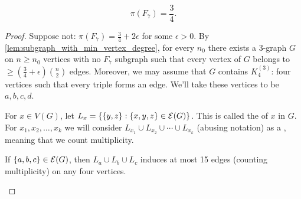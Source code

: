 \begin{theorem} 
\[	
\pi(F_7) = \frac{3}{4}.
\]
\end{theorem}
\begin{proof}	
Suppose not: $\pi(F_7) = \frac{3}{4}+ 2 \epsilon$ for some $\epsilon>0$. By \cref{lem:subgraph_with_min_vertex_degree},  for every $n_0$ there exists a $3$-graph $G$ on $n\geq n_0$ vertices with no $F_7$ subgraph such that every vertex of $G$ belongs to $\geq ( \frac{3}{4} + \epsilon) {n\choose 2}$ edges. Moreover, we may assume that $G$ contains $K_4^{(3)}$: four vertices such that every triple forms an edge.
 We'll take these vertices to be $a,b,c,d$.

For $x\in V(G)$, let $L_x = \{ \{y,z\}: \{x,y,z\} \in \mathcal{E} (G) \}$. This is called the  of $x$ in $G$.
For $x_1,x_2,\dotsc,x_k$ we will consider $L_{x_1} \cup L_{x_2} \cup \dotsm \cup L_{x_k}$ (abusing notation) as a , meaning that we count multiplicity.

\begin{claim}
If $\{a,b,c\}\in \mathcal{E} (G)$, then $L_a \cup L_b\cup L_c$ induces at most 15 edges (counting multiplicity) on any four vertices. 
\end{claim}




\end{proof}
